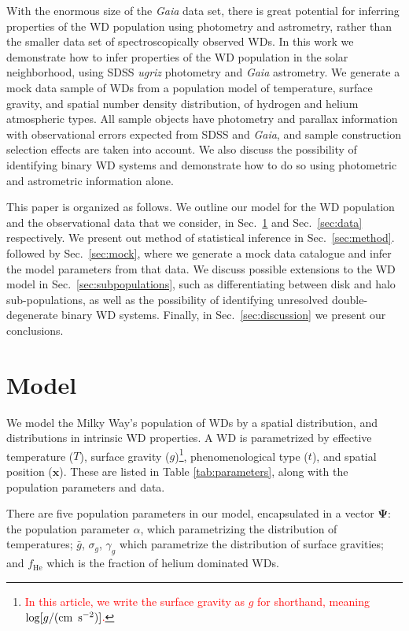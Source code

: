\documentclass[fleqn,usenatbib]{mnras}
\newcommand{\changes}[1]{\textcolor{red}{#1}}
\newcommand{\popp}{\boldsymbol{\Psi}}
\newcommand{\Teff}{T}
\newcommand{\logg}{g}
\begin{document}
With the enormous size of the \emph{Gaia} data set, there is great potential for inferring properties of the WD population using photometry and astrometry, rather than the smaller data set of spectroscopically observed WDs. In this work we demonstrate how to infer properties of the WD population in the solar neighborhood, using SDSS \emph{ugriz} photometry and \emph{Gaia} astrometry. We generate a mock data sample of WDs from a population model of temperature, surface gravity, and spatial number density distribution, of hydrogen and helium atmospheric types. All sample objects have photometry and parallax information with observational errors expected from SDSS and \emph{Gaia}, and sample construction selection effects are taken into account. We also discuss the possibility of identifying binary WD systems and demonstrate how to do so using photometric and astrometric information alone.

This paper is organized as follows. We outline our model for the WD population and the observational data that we consider, in Sec.~\ref{sec:model} and Sec.~\ref{sec:data} respectively. We present out method of statistical inference in Sec.~\ref{sec:method}.  followed by Sec.~\ref{sec:mock}, where we generate a mock data catalogue and infer the model parameters from that data. We discuss possible extensions to the WD model in Sec.~\ref{sec:subpopulations}, such as differentiating between disk and halo sub-populations, as well as the possibility of identifying unresolved double-degenerate binary WD systems. Finally, in Sec.~\ref{sec:discussion} we present our conclusions.





\section{Model}\label{sec:model}

We model the Milky Way's population of WDs by a spatial distribution, and distributions in intrinsic WD properties. A WD is parametrized by effective temperature ($\Teff$), surface gravity ($\logg$)\footnote{\changes{In this article, we write the surface gravity as $g$ for shorthand, meaning $\log[g/(\text{cm\, s}^{-2})]$.}}, phenomenological type ($t$), and spatial position ($\mathbf{x}$). These are listed in Table \ref{tab:parameters}, along with the population parameters and data.

There are five population parameters in our model, encapsulated in a vector $\popp$: the population parameter $\alpha$, which parametrizing the distribution of temperatures; $\bar{g}$, $\sigma_g$, $\gamma_g$ which parametrize the distribution of surface gravities; and $f_\text{He}$ which is the fraction of helium dominated WDs.
\end{document}
